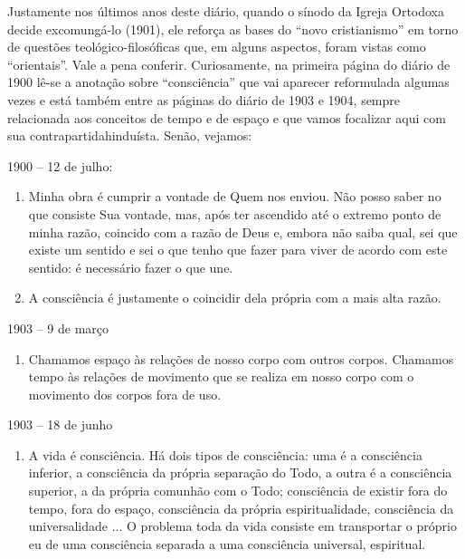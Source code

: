 Justamente nos últimos anos deste diário, quando o sínodo da Igreja
Ortodoxa decide excomungá-lo (1901), ele reforça as bases do ``novo
cristianismo'' em torno de questões teológico-filosóficas que, em alguns
aspectos, foram vistas como ``orientais''. Vale a pena conferir.
Curiosamente, na primeira página do diário de 1900 lê-se a anotação
sobre ``consciência'' que vai aparecer reformulada algumas vezes e está
também entre as páginas do diário de 1903 e 1904, sempre relacionada aos
conceitos de tempo e de espaço e que vamos focalizar aqui com sua
contrapartidahinduísta. Senão, vejamos:

1900 -- 12 de julho:

\begin{enumerate}
\def\labelenumi{\arabic{enumi})}
\item
  Minha obra é cumprir a vontade de Quem nos enviou. Não posso saber no
  que consiste Sua vontade, mas, após ter ascendido até o extremo ponto
  de minha razão, coincido com a razão de Deus e, embora não saiba qual,
  sei que existe um sentido e sei o que tenho que fazer para viver de
  acordo com este sentido: é necessário fazer o que une.
\item
  A consciência é justamente o coincidir dela própria com a mais alta
  razão.
\end{enumerate}

1903 -- 9 de março

\begin{enumerate}
\def\labelenumi{\arabic{enumi})}
\item
  Chamamos espaço às relações de nosso corpo com outros corpos. Chamamos
  tempo às relações de movimento que se realiza em nosso corpo com o
  movimento dos corpos fora de uso.
\end{enumerate}

1903 -- 18 de junho

\begin{enumerate}
\def\labelenumi{\arabic{enumi})}
\item
  A vida é consciência. Há dois tipos de consciência: uma é a
  consciência inferior, a consciência da própria separação do Todo, a
  outra é a consciência superior, a da própria comunhão com o Todo;
  consciência de existir fora do tempo, fora do espaço, consciência da
  própria espiritualidade, consciência da universalidade ... O problema
  toda da vida consiste em transportar o próprio eu de uma consciência
  separada a uma consciência universal, espiritual.
\end{enumerate}

